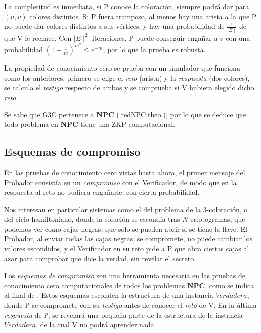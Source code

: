 La completitud es inmediata, si P conoce la coloración, siempre podrá dar para $(u,v)$ colores distintos. Si P fuera tramposo, al menos hay una arista a la que P no puede dar colores distintos a sus vértices, y hay una probabilidad de $\frac{1}{\mid E \mid}$ de que V le rechace. Con $\mid E \mid ^2$ iteraciones, P puede conseguir engañar a v con una probabilidad $(1-\frac{1}{m})^{m^2} \leq e^{-m}$, por lo que la prueba es robusta.

La propiedad de conocimiento cero se prueba con un simulador que funciona como los anteriores, primero se elige el \textit{reto} (arista) y la \textit{respuesta} (dos colores), se calcula el \textit{testigo} respecto de ambos y se comprueba si V hubiera elegido dicho \textit{reto}.

\hfil

Se sabe que G3C pertenece a \textbf{NPC} (\ref{redNPC:theo}), por lo que se deduce que todo problema en \textbf{NPC} tiene una ZKP computacional.


\subsection{Esquemas de compromiso}\label{bitcommitment}

En las pruebas de conocimiento cero vistas hasta ahora, el primer mensaje del Probador consistía en un \textit{compromiso} con el Verificador, de modo que en la respuesta al reto no pudiera engañarle, con cierta probabilidad.

Nos interesan en particular sistemas como el del problema de la 3-coloración, o del ciclo hamiltoniano, donde la solución se escondía tras $N$ criptogramas, que podemos ver como cajas negras, que sólo se pueden abrir si se tiene la llave. El Probador, al enviar todas las cajas negras, se compromete, no puede cambiar los valores escondidos, y el Verificador en su reto pide a P que abra ciertas cajas al azar para comprobar que dice la verdad, sin revelar el secreto.

Los \textit{esquemas de compromiso} son una herramienta necesaria en las pruebas de conocimiento cero computacionales de todos los problemas \textbf{NPC}, como se indica al final de \citep{blum}. Estos esquemas esconden la estructura de una instancia $Verdadera$, donde P se compromete con su \textit{testigo} antes de conocer el \textit{reto} de V. En la última \textit{respuesta} de P, se revelará una pequeña parte de la estructura de la instancia $Verdadera$, de la cual V no podrá aprender nada.


